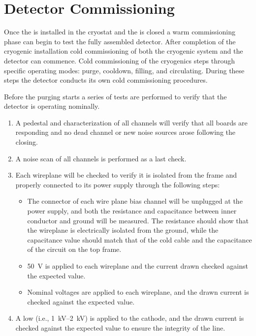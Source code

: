 \section{Detector Commissioning}
\label{sec:fdsp-tc-commiss}


Once the  is installed in the cryostat and the  is closed a warm commissioning phase can begin to test the fully assembled detector.  After completion of the cryogenic installation cold commissioning of both the cryogenic system and the detector can commence. Cold commissioning of the cryogenics steps through specific operating modes: purge, cooldown, filling, and circulating. During these steps the detector conducts its own cold commissioning procedures.
 

Before the purging starts a series of tests are performed to verify that the detector is operating nominally. 

\begin{enumerate}

    \item A pedestal and  characterization of all  channels will verify that all   boards are responding and no dead channel or new noise sources arose following the  closing.
    
    \item A noise scan of all  channels is performed as a last check. %

    \item Each  wireplane will be checked to verify it is isolated from the  frame and properly connected to its  power supply through the following steps:
    
\begin{itemize}

    \item The  connector of each wire plane bias channel will be unplugged at the power supply, and both the resistance and capacitance between inner conductor and ground will be measured. 
    The resistance should show that the wireplane is electrically isolated from the ground, while the capacitance value should match that of the cold  cable and the capacitance of the circuit on the  top frame.

    \item \SI{50}{V} is applied to each wireplane and the current drawn checked against the expected value.
    
    \item Nominal voltages are applied to each wireplane, and the  drawn current is checked against the expected value. 
    
\end{itemize}

    \item A low  (i.e., \SIrange{1}{2}{kV}) is applied to the cathode, and the drawn current is checked against the expected value to ensure the integrity of the  line.

\end{enumerate}

